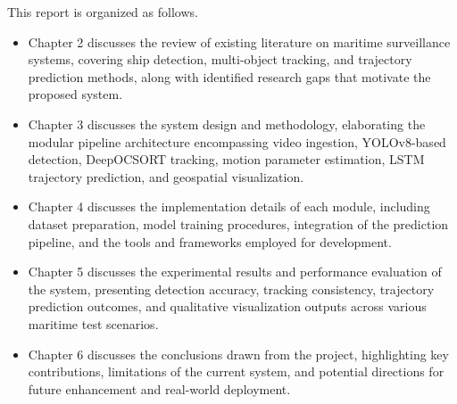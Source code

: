 This report is organized as follows.
\begin{itemize}
\item Chapter 2 discusses the review of existing literature on maritime surveillance systems, covering ship detection, multi-object tracking, and trajectory prediction methods, along with identified research gaps that motivate the proposed system.
\item Chapter 3 discusses the system design and methodology, elaborating the modular pipeline architecture encompassing video ingestion, YOLOv8-based detection, DeepOCSORT tracking, motion parameter estimation, LSTM trajectory prediction, and geospatial visualization.
\item Chapter 4 discusses the implementation details of each module, including dataset preparation, model training procedures, integration of the prediction pipeline, and the tools and frameworks employed for development.
\item Chapter 5 discusses the experimental results and performance evaluation of the system, presenting detection accuracy, tracking consistency, trajectory prediction outcomes, and qualitative visualization outputs across various maritime test scenarios.
\item Chapter 6 discusses the conclusions drawn from the project, highlighting key contributions, limitations of the current system, and potential directions for future enhancement and real-world deployment.
\end{itemize}